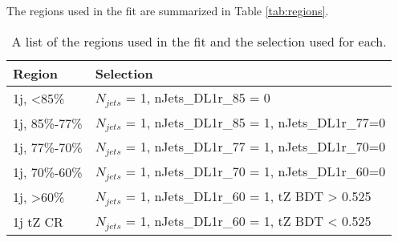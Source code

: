
The regions used in the fit are summarized in Table \ref{tab:regions}.

\begin{table}[H] 
\centering
\caption{A list of the regions used in the fit and the selection used for each.}
\begin{tabular}{l|l}
\hline\hline
Region & Selection  	      \\
\hline
\hline
1j, <85\%       & $N_{jets}$ = 1, nJets_DL1r_85 = 0            \\
1j, 85\%-77\%   & $N_{jets}$ = 1, nJets_DL1r_85 = 1, nJets_DL1r_77=0                     \\
1j, 77\%-70\%   & $N_{jets}$ = 1, nJets_DL1r_77 = 1, nJets_DL1r_70=0                     \\                          
1j, 70\%-60\%   & $N_{jets}$ = 1, nJets_DL1r_70 = 1, nJets_DL1r_60=0                      \\
1j, >60\%       & $N_{jets}$ = 1, nJets_DL1r_60 = 1, tZ BDT > 0.525 \\
1j tZ CR        & $N_{jets}$ = 1, nJets_DL1r_60 = 1, tZ BDT < 0.525 \\

\end{tabular}
\end{table}
